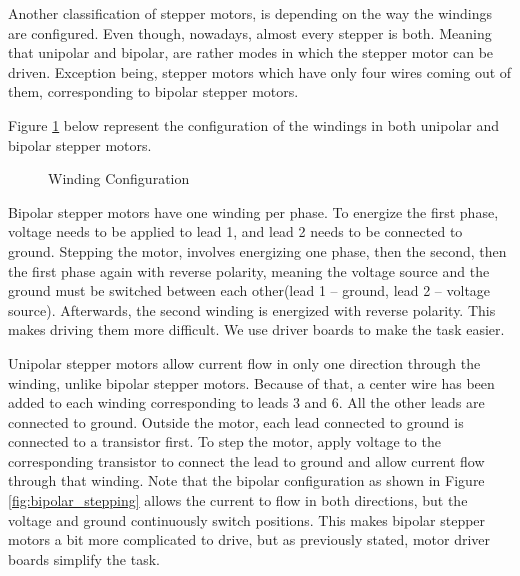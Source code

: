 Another classification of stepper motors, is depending on the way the windings are configured.
Even though, nowadays, almost every stepper is both.
Meaning that unipolar and bipolar, are rather modes in which the stepper motor can be driven.
Exception being, stepper motors which have only four wires coming out of them, corresponding to 
bipolar stepper motors.

Figure \ref{fig:windings} below represent the configuration of the windings in both unipolar and 
bipolar stepper motors. 


\begin{figure}[htp] 
    \centering
    \hfill
    \caption{Winding Configuration} \cite{figures}
    \label{fig:windings}
\end{figure}

Bipolar stepper motors have one winding per phase. To energize the first phase, voltage needs to 
be applied to lead 1, and lead 2 needs to be connected to ground. Stepping the motor, 
involves energizing one phase, then the second, then the first phase again with reverse
polarity, meaning the voltage source and the ground must be switched between each other(lead 1 – 
ground, lead 2 – voltage source). Afterwards, the second winding is energized with reverse 
polarity. This makes driving them more difficult. We use driver boards to make the task easier. 

Unipolar stepper motors allow current flow in only one direction through the winding, unlike 
bipolar stepper motors. Because of that, a center wire has been added to each winding corresponding 
to leads 3 and 6. All the other leads are connected to ground. Outside the motor, each lead 
connected to ground is connected to a transistor first. To step the motor, apply voltage to 
the corresponding transistor to connect the lead to ground and allow current flow 
through that winding.  
\newpage
Note that the bipolar configuration as shown in Figure \ref{fig:bipolar_stepping} allows the 
current to flow in both directions, but the voltage and ground continuously switch positions. This 
makes bipolar stepper motors a bit more complicated to drive, but as previously stated, motor 
driver boards simplify the task.

